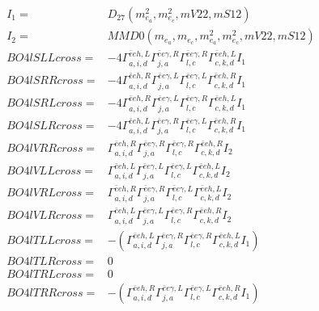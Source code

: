 \documentclass[A4,landscape]{article}
\begin{document}
\begin{align} 
I_1 = & D_{27}(m^2_{e_{{a}}}, m^2_{e_{{c}}}, mV22, mS12) \\ 
I_2 = & MMD0(m_{e_{{a}}}, m_{e_{{c}}}, m^2_{e_{{a}}}, m^2_{e_{{c}}}, mV22, mS12) \\ 
  BO4lSLLcross= & -4  \Gamma^{\bar{e}e h ,L}_{a, i, d} \Gamma^{\bar{e}e \gamma ,R}_{j, a} \Gamma^{\bar{e}e \gamma ,R}_{l, c} \Gamma^{\bar{e}e h ,L}_{c, k, d} I_1 \\ 
  BO4lSRRcross= & -4  \Gamma^{\bar{e}e h ,R}_{a, i, d} \Gamma^{\bar{e}e \gamma ,L}_{j, a} \Gamma^{\bar{e}e \gamma ,L}_{l, c} \Gamma^{\bar{e}e h ,R}_{c, k, d} I_1 \\ 
  BO4lSRLcross= & -4  \Gamma^{\bar{e}e h ,R}_{a, i, d} \Gamma^{\bar{e}e \gamma ,L}_{j, a} \Gamma^{\bar{e}e \gamma ,R}_{l, c} \Gamma^{\bar{e}e h ,L}_{c, k, d} I_1 \\ 
  BO4lSLRcross= & -4  \Gamma^{\bar{e}e h ,L}_{a, i, d} \Gamma^{\bar{e}e \gamma ,R}_{j, a} \Gamma^{\bar{e}e \gamma ,L}_{l, c} \Gamma^{\bar{e}e h ,R}_{c, k, d} I_1 \\ 
  BO4lVRRcross= &  \Gamma^{\bar{e}e h ,R}_{a, i, d} \Gamma^{\bar{e}e \gamma ,R}_{j, a} \Gamma^{\bar{e}e \gamma ,R}_{l, c} \Gamma^{\bar{e}e h ,R}_{c, k, d} I_2 \\ 
  BO4lVLLcross= &  \Gamma^{\bar{e}e h ,L}_{a, i, d} \Gamma^{\bar{e}e \gamma ,L}_{j, a} \Gamma^{\bar{e}e \gamma ,L}_{l, c} \Gamma^{\bar{e}e h ,L}_{c, k, d} I_2 \\ 
  BO4lVRLcross= &  \Gamma^{\bar{e}e h ,R}_{a, i, d} \Gamma^{\bar{e}e \gamma ,R}_{j, a} \Gamma^{\bar{e}e \gamma ,L}_{l, c} \Gamma^{\bar{e}e h ,L}_{c, k, d} I_2 \\ 
  BO4lVLRcross= &  \Gamma^{\bar{e}e h ,L}_{a, i, d} \Gamma^{\bar{e}e \gamma ,L}_{j, a} \Gamma^{\bar{e}e \gamma ,R}_{l, c} \Gamma^{\bar{e}e h ,R}_{c, k, d} I_2 \\ 
  BO4lTLLcross= & -( \Gamma^{\bar{e}e h ,L}_{a, i, d} \Gamma^{\bar{e}e \gamma ,R}_{j, a} \Gamma^{\bar{e}e \gamma ,R}_{l, c} \Gamma^{\bar{e}e h ,L}_{c, k, d} I_1) \\ 
  BO4lTLRcross= & 0 \\ 
  BO4lTRLcross= & 0 \\ 
  BO4lTRRcross= & -( \Gamma^{\bar{e}e h ,R}_{a, i, d} \Gamma^{\bar{e}e \gamma ,L}_{j, a} \Gamma^{\bar{e}e \gamma ,L}_{l, c} \Gamma^{\bar{e}e h ,R}_{c, k, d} I_1) \\ 
\end{align} 
\end{document}
